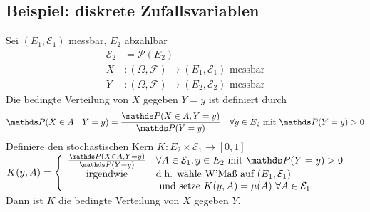 \subsection{Beispiel: diskrete Zufallsvariablen}
\label{sub:bsp_dis_zv}
Sei $(E_1,\mathcal{E}_1)$ messbar, $E_2$ abzählbar
\begin{equation*}
\begin{aligned}
	\mathcal{E}_2 &= \mathcal{P}(E_2)\\
	X &: (\Omega,\mathcal{F})\to (E_1,\mathcal{E}_1) \text{ messbar}\\
	Y &: (\Omega,\mathcal{F})\to (E_2,\mathcal{E}_2)\text{ messbar}
\end{aligned}
\end{equation*}
Die bedingte Verteilung von $X$ gegeben $Y=y$ ist definiert durch 
\[
\Pw(X\in A~|~Y=y)=\frac{\Pw(X\in A,Y=y)}{\Pw(Y=y)}\quad \forall y\in E_2 \text{ mit } \Pw(Y=y)>0 
\]
Definiere den stochastischen Kern $K: E_2\times \mathcal{E}_1\to [0,1]$\\
$K(y,A)=\left\{\begin{array}{cl} 
\frac{\Pw(X\in A,Y=y)}{\Pw(Y=y)} & \forall A\in \mathcal{E}_1,y\in E_2 \text{ mit }\Pw(Y=y)>0\\
\text{irgendwie} & \text{d.h. wähle W'Maß auf } (E_1,\mathcal{E}_1)\\
& \text{ und setze } K(y,A)=\mu(A)~\forall A\in \mathcal{E}_1  \end{array}\right.$\\

Dann ist $K$ die bedingte Verteilung von $X$ gegeben $Y$.
\newpage

